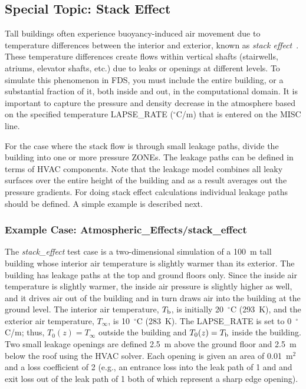 \documentclass[11pt]{book}
\begin{document}
\subsection{Special Topic: Stack Effect}
\label{info:stackeffect}

Tall buildings often experience buoyancy-induced air movement due to temperature differences between the interior and exterior, known as {\em stack effect}~\cite{Klote_Milke}. These temperature differences create flows within vertical shafts (stairwells, atriums, elevator shafts, etc.) due to leaks or openings at different levels. To simulate this phenomenon in FDS, you must include the entire building, or a substantial fraction of it, both inside and out, in the computational domain. It is important to capture the pressure and density decrease in the atmosphere based on the specified temperature {\ct LAPSE\_RATE} ($^\circ$C/m) that is entered on the {\ct MISC} line.

For the case where the stack flow is through small leakage paths, divide the building into one or more pressure {\ct ZONE}s. The leakage paths can be defined in terms of HVAC components. Note that the leakage model combines all leaky surfaces over the entire height of the building and as a result averages out the pressure gradients. For doing stack effect calculations individual leakage paths should be defined. A simple example is described next.

\subsubsection{Example Case: Atmospheric\_Effects/stack\_effect}

The {\em stack\_effect} test case is a two-dimensional simulation of a 100~m tall building whose interior air temperature is slightly warmer than its exterior. The building has leakage paths at the top and ground floors only. Since the inside air temperature is slightly warmer, the inside air pressure is slightly higher as well, and it drives air out of the building and in turn draws air into the building at the ground level.
The interior air temperature, $T_{\rm b}$, is initially 20~$^\circ$C (293~K), and the exterior air temperature, $T_\infty$, is
10~$^\circ$C (283~K). The {\ct LAPSE\_RATE} is set to 0~$^\circ$C/m; thus, $T_0(z)=T_\infty$ outside the building and $T_0(z)=T_{\rm b}$ inside the building. Two small leakage openings are defined 2.5~m above the ground floor and 2.5~m below the roof using the HVAC solver. Each opening is given an area of 0.01~m$^2$ and a loss coefficient of 2 (e.g., an entrance loss into the leak path of 1 and and exit loss out of the leak path of 1 both of which represent a sharp edge opening).
\end{document}
